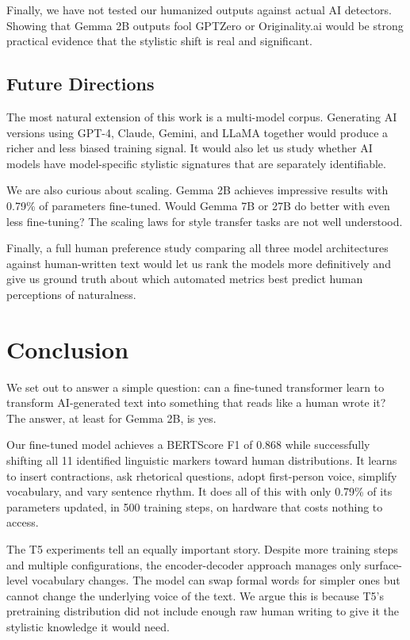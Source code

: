 \documentclass{article}
\begin{document}
Finally, we have not tested our humanized outputs against actual AI detectors. Showing that Gemma 2B outputs fool GPTZero or Originality.ai would be strong practical evidence that the stylistic shift is real and significant.

\subsection{Future Directions}

The most natural extension of this work is a multi-model corpus. Generating AI versions using GPT-4, Claude, Gemini, and LLaMA together would produce a richer and less biased training signal. It would also let us study whether AI models have model-specific stylistic signatures that are separately identifiable.

We are also curious about scaling. Gemma 2B achieves impressive results with 0.79\% of parameters fine-tuned. Would Gemma 7B or 27B do better with even less fine-tuning? The scaling laws for style transfer tasks are not well understood.

Finally, a full human preference study comparing all three model architectures against human-written text would let us rank the models more definitively and give us ground truth about which automated metrics best predict human perceptions of naturalness.

\section{Conclusion}

We set out to answer a simple question: can a fine-tuned transformer learn to transform AI-generated text into something that reads like a human wrote it? The answer, at least for Gemma 2B, is yes.

Our fine-tuned model achieves a BERTScore F1 of 0.868 while successfully shifting all 11 identified linguistic markers toward human distributions. It learns to insert contractions, ask rhetorical questions, adopt first-person voice, simplify vocabulary, and vary sentence rhythm. It does all of this with only 0.79\% of its parameters updated, in 500 training steps, on hardware that costs nothing to access.

The T5 experiments tell an equally important story. Despite more training steps and multiple configurations, the encoder-decoder approach manages only surface-level vocabulary changes. The model can swap formal words for simpler ones but cannot change the underlying voice of the text. We argue this is because T5's pretraining distribution did not include enough raw human writing to give it the stylistic knowledge it would need.
\end{document}
